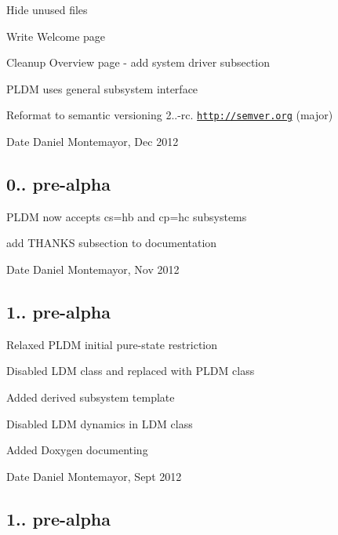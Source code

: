 \begin{DoxyItemize}
\item Hide unused files
\item Write Welcome page
\item Cleanup Overview page -\/ add system driver subsection
\item P\-L\-D\-M uses general subsystem interface
\item Reformat to semantic versioning 2..-\/rc. \href{http://semver.org}{\tt http\-://semver.\-org} (major) \begin{DoxyDate}{Date}
Daniel Montemayor, Dec 2012
\end{DoxyDate}

\end{DoxyItemize}\hypertarget{_tags_v0_0_5pa}{}\subsection{0.. pre-\/alpha}\label{_tags_v0_0_5pa}

\begin{DoxyItemize}
\item P\-L\-D\-M now accepts cs=hb and cp=hc subsystems
\item add T\-H\-A\-N\-K\-S subsection to documentation \begin{DoxyDate}{Date}
Daniel Montemayor, Nov 2012
\end{DoxyDate}

\end{DoxyItemize}\hypertarget{_tags_v1_0_4pa}{}\subsection{1.. pre-\/alpha}\label{_tags_v1_0_4pa}

\begin{DoxyItemize}
\item Relaxed P\-L\-D\-M initial pure-\/state restriction
\item Disabled L\-D\-M class and replaced with P\-L\-D\-M class
\item Added derived subsystem template
\item Disabled L\-D\-M dynamics in L\-D\-M class
\item Added Doxygen documenting \begin{DoxyDate}{Date}
Daniel Montemayor, Sept 2012
\end{DoxyDate}

\end{DoxyItemize}\hypertarget{_tags_v1_0_1pa}{}\subsection{1.. pre-\/alpha}\label{_tags_v1_0_1pa}


